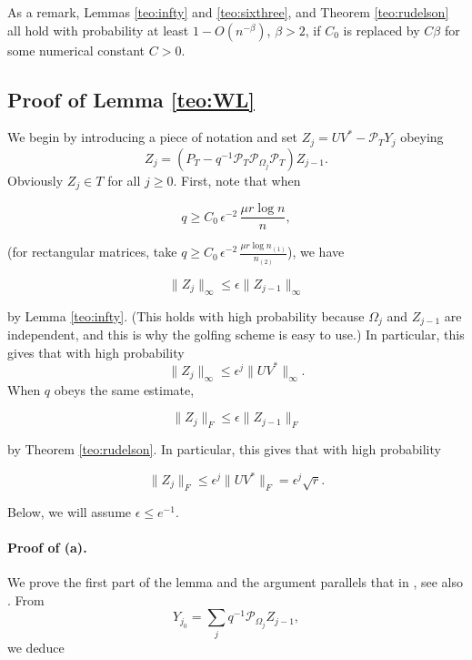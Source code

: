 As a remark, Lemmas \ref{teo:infty} and \ref{teo:sixthree}, and Theorem
\ref{teo:rudelson} all hold with probability at least $1 -
O(n^{-\beta})$, $\beta > 2$, if $C_0$ is replaced by $C \beta$ for some numerical constant $C > 0$. 

\subsection{Proof of Lemma \ref{teo:WL}}
\label{sec:WL}

We begin by introducing a piece of notation and set $Z_j = UV^* - \mathcal{P}_T
Y_j$ obeying
\[
Z_j = (P_T - q^{-1} \mathcal{P}_T \mathcal{P}_{\Omega_j} \mathcal{P}_T) Z_{j-1}. 
\]
Obviously $Z_j \in T$ for all $j \ge 0$.  First, note that when

\begin{equation}
\label{eq:q}
q \ge C_0 \, \epsilon^{-2} \,
\frac{\mu r \log n}{n},
\end{equation}

(for rectangular matrices, take $q \ge C_0 \, \epsilon^{-2} \,
\frac{\mu r \log n_{(1)}}{n_{(2)}}$), we have

\begin{equation}
\|Z_j\|_\infty \le \epsilon \| Z_{j-1} \|_\infty  
\label{eq:infty-useful}
\end{equation}

by Lemma \ref{teo:infty}. (This holds with high probability because $\Omega_j$ and $Z_{j-1}$ are independent, and this is why the golfing scheme is easy to use.) In particular, this gives that with high probability
\[
\|Z_j\|_\infty \le \epsilon^j \|UV^*\|_\infty. 
\]
When $q$ obeys the same estimate,

\begin{equation}
\|Z_j\|_F \le \epsilon \|Z_{j-1}\|_F 
\label{eq:infty-useful2}
\end{equation}

by Theorem \ref{teo:rudelson}.  In particular, this gives that with high probability

\begin{equation}
  \label{eq:F-useful}
  \|Z_j\|_F \le \epsilon^{j} \|UV^*\|_F = \epsilon^j \sqrt{r}. 
\end{equation}

Below, we will assume $\epsilon \le e^{-1}$. 

\paragraph{Proof of (a).} We prove the first part of the lemma and the argument parallels that in \cite{GrossMC}, see also \cite{RechtMC}. From
\[
Y_{j_0} = \sum_j q^{-1} \mathcal{P}_{\Omega_j} Z_{j-1},
\]
we deduce

